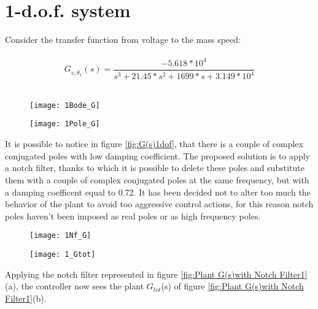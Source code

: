 \section{1-d.o.f. system}
Consider the transfer function from voltage to the mass speed:\\
\\
\[	
G_{v, \dot \theta_1}(s)=
\frac{-5.618*10^{4}}{{s^3+21.45*s^{2}}+1699*s+3.149*10^{4}}
\]
\\


\begin{figure*}[h]
	\centering
	\begin{subfigure}{0.4\columnwidth}
		\texttt{[image: 1Bode\_G]}
	\end{subfigure}
	\begin{subfigure}{0.4\columnwidth}
		\texttt{[image: 1Pole\_G]}
	\end{subfigure}
	\caption{G(s)}
	\label{fig:G(s)1dof}
\end{figure*}

It is possible to notice in figure \ref{fig:G(s)1dof}, that there is a couple of complex conjugated poles with low damping coefficient. The proposed solution is to apply a notch filter, thanks to which it is possible to delete these poles and substitute them with a couple of complex conjugated poles at the same frequency, but with a damping coefficent equal to 0.72. It has been decided not to alter too much the behavior of the plant to avoid too aggressive control actions, for this reason notch poles haven't been imposed as real poles or as high frequency poles.

\begin{figure*}[h]
	\centering
	\begin{subfigure}{0.35\columnwidth}
		\texttt{[image: 1Nf\_G]}
	\end{subfigure}
	\begin{subfigure}{0.35\columnwidth}
		\texttt{[image: 1\_Gtot]}
	\end{subfigure}
	\caption{Plant G(s) with Notch Filter Nf(s): $G_{tot}$(s)}
	\label{fig:Plant G(s)with Notch Filter1}
\end{figure*}


Applying the notch filter represented in figure \ref{fig:Plant G(s)with Notch Filter1}(a), the controller now sees the plant $G_{tot}$(s) of figure \ref{fig:Plant G(s)with Notch Filter1}(b).



